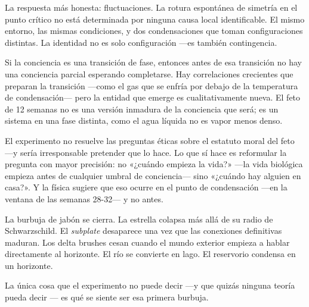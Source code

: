 La respuesta más honesta: fluctuaciones. La rotura espontánea de simetría en el punto crítico no está determinada por ninguna causa local identificable. El mismo entorno, las mismas condiciones, y dos condensaciones que toman configuraciones distintas. La identidad no es solo configuración —es también contingencia.

\noindent Si la conciencia es una transición de fase, entonces antes de esa transición no hay una conciencia parcial esperando completarse. Hay correlaciones crecientes que preparan la transición —como el gas que se enfría por debajo de la temperatura de condensación— pero la entidad que emerge es cualitativamente nueva. El feto de 12 semanas no es una versión inmadura de la conciencia que será; es un sistema en una fase distinta, como el agua líquida no es vapor menos denso.

El experimento no resuelve las preguntas éticas sobre el estatuto moral del feto —y sería irresponsable pretender que lo hace. Lo que sí hace es reformular la pregunta con mayor precisión: no «¿cuándo empieza la vida?» —la vida biológica empieza antes de cualquier umbral de conciencia— sino «¿cuándo hay alguien en casa?». Y la física sugiere que eso ocurre en el punto de condensación —en la ventana de las semanas 28-32— y no antes.

La burbuja de jabón se cierra. La estrella colapsa más allá de su radio de Schwarzschild. El \emph{subplate} desaparece una vez que las conexiones definitivas maduran. Los delta brushes cesan cuando el mundo exterior empieza a hablar directamente al horizonte. El río se convierte en lago. El reservorio condensa en un horizonte.

La única cosa que el experimento no puede decir —y que quizás ninguna teoría pueda decir — es qué se siente ser esa primera burbuja.

